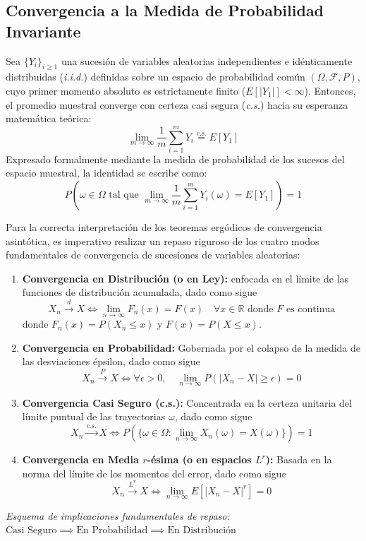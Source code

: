 \documentclass[10pt]{book}
\begin{document}
\subsection{Convergencia a la Medida de Probabilidad Invariante}

\begin{teo}
    Sea $\{Y_i\}_{i \geq 1}$ una sucesión de variables aleatorias independientes e idénticamente distribuidas (\textit{i.i.d.}) definidas sobre un espacio de probabilidad común $(\Omega, \mathcal{F}, P)$, cuyo primer momento absoluto es estrictamente finito ($E[|Y_1|] < \infty$). Entonces, el promedio muestral converge con certeza casi segura (\textit{c.s.}) hacia su esperanza matemática teórica:
    \[
    \lim_{m \to \infty} \frac{1}{m} \sum_{i=1}^{m} Y_i \overset{\text{c.s.}}{=} E[Y_1]
    \]
    Expresado formalmente mediante la medida de probabilidad de los sucesos del espacio muestral, la identidad se escribe como:
    \[
    P\left( \omega \in \Omega \text{ tal que } \lim_{m \to \infty} \frac{1}{m} \sum_{i=1}^{m} Y_i(\omega) = E[Y_1] \right) = 1
    \]
\end{teo}

\begin{observacion}
    Para la correcta interpretación de los teoremas ergódicos de convergencia asintótica, es imperativo realizar un repaso riguroso de los cuatro modos fundamentales de convergencia de sucesiones de variables aleatorias:
    \begin{enumerate}
        \item \textbf{Convergencia en Distribución (o en Ley):} enfocada en el límite de las funciones de distribución acumulada, dado como sigue
        $$ X_n \xrightarrow{d} X \iff \lim_{n \to \infty} F_n(x) = F(x) \quad \forall x \in \mathbb{R} \text{ donde } F \text{ es continua} $$
        donde $F_n(x) = P(X_n \leq x)$ y $F(x) = P(X \leq x)$.
        \item \textbf{Convergencia en Probabilidad:} Gobernada por el colapso de la medida de las desviaciones épsilon, dado como sigue
        $$ X_n \xrightarrow{P} X \iff \forall \epsilon > 0, \quad \lim_{n \to \infty} P(|X_n - X| \geq \epsilon) = 0 $$
        \item \textbf{Convergencia Casi Seguro (c.s.):} Concentrada en la certeza unitaria del límite puntual de las trayectorias $\omega$, dado como sigue
        $$ X_n \xrightarrow{c.s.} X \iff P\left( \{\omega \in \Omega : \lim_{n \to \infty} X_n(\omega) = X(\omega)\} \right) = 1 $$
        \item \textbf{Convergencia en Media $r$-ésima (o en espacios $L^r$):} Basada en la norma del límite de los momentos del error, dado como sigue
        $$ X_n \xrightarrow{L^r} X \iff \lim_{n \to \infty} E\left[ |X_n - X|^r \right] = 0 $$
    \end{enumerate}
    \begin{center}
        \textit{Esquema de implicaciones fundamentales de repaso:} \quad $\text{Casi Seguro} \implies \text{En Probabilidad} \implies \text{En Distribución}$
    \end{center}
\end{observacion}
\end{document}
